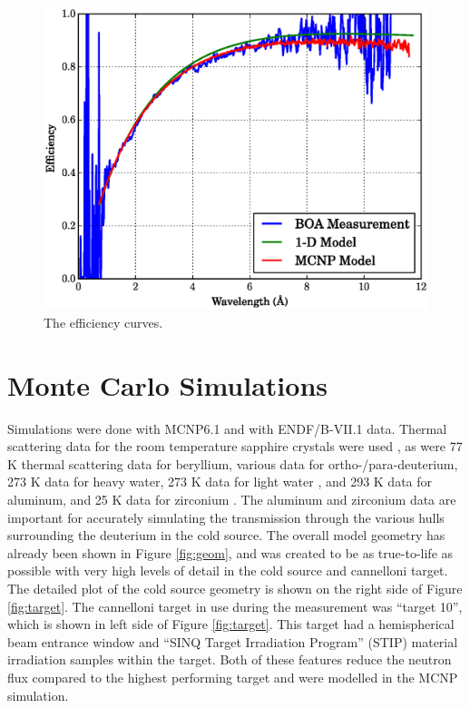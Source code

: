 \documentclass[5p,12pt]{elsarticle}
\begin{document}
\begin{figure}[h!] 
  \centering
    \includegraphics[width=\columnwidth]{graphics/eff.eps}
     \caption{The efficiency curves. \label{fig:eff} }
\end{figure}


\section{Monte Carlo Simulations}
\label{sec:sim}

Simulations were done with MCNP6.1 and with ENDF/B-VII.1 data.  Thermal scattering data for the room temperature sapphire crystals were used \cite{sapp}, as were 77 K thermal scattering data for beryllium, various data for ortho-/para-deuterium, 273 K data for heavy water, 273 K data for light water \cite{mcnp6}, and 293 K data for aluminum, and 25 K data for zirconium \cite{IKE}.  The aluminum and zirconium data are important for accurately simulating the transmission through the various hulls surrounding the deuterium in the cold source.  The overall model geometry has already been shown in Figure \ref{fig:geom}, and was created to be as true-to-life as possible with very high levels of detail in the cold source and cannelloni target.  The detailed plot of the cold source geometry is shown on the right side of Figure \ref{fig:target}.  The cannelloni target in use during the measurement was ``target 10'', which is shown in left side of Figure \ref{fig:target}. This target had a hemispherical beam entrance window and ``SINQ Target Irradiation Program'' (STIP) material irradiation samples within the target.  Both of these features reduce the neutron flux compared to the highest performing target and were modelled in the MCNP simulation.
\end{document}
